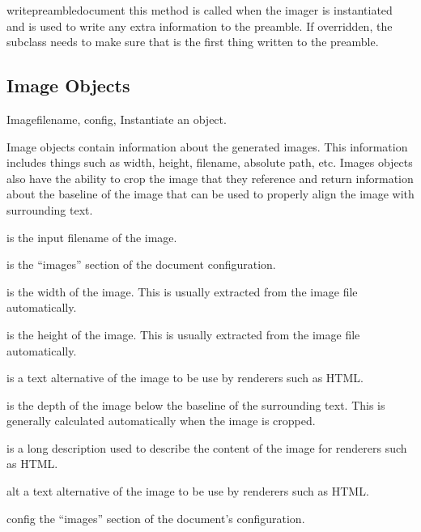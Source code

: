 \begin{methoddesc}[Imager]{writepreamble}{document}
this method is called when the imager is instantiated and is used to 
write any extra information to the preamble.  If overridden, the
subclass needs to make sure that  is
the first thing written to the preamble.
\end{methoddesc}


\subsection{Image Objects}

\begin{classdesc}{Image}{filename, config, }
Instantiate an  object.

Image objects contain information about the generated images.  This 
information includes things such as width, height, filename, absolute
path, etc.  Images objects also have the ability to crop the image
that they reference and return information about the baseline of the 
image that can be used to properly align the image with surrounding
text.

 is the input filename of the image.

 is the ``images'' section of the document configuration.

 is the width of the image.  This is usually extracted from
the image file automatically.

 is the height of the image.  This is usually extracted
from the image file automatically.

 is a text alternative of the image to be use by renderers such
as HTML.

 is the depth of the image below the baseline of the 
surrounding text.  This is generally calculated automatically when
the image is cropped.

 is a long description used to describe the content of 
the image for renderers such as HTML.
\end{classdesc}

\begin{memberdesc}[Image]{alt}
a text alternative of the image to be use by renderers such as HTML.
\end{memberdesc}

\begin{memberdesc}[Image]{config}
the ``images'' section of the document's configuration.
\end{memberdesc}

